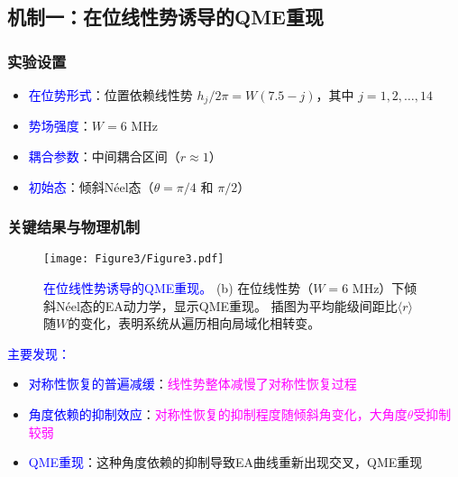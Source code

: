 \documentclass[11pt,a4paper]{article}
\begin{document}
\subsection{机制一：在位线性势诱导的QME重现}

\subsubsection{实验设置}
\begin{itemize}
    \item \textcolor{blue}{在位势形式}：位置依赖线性势 $h_j/2\pi = W(7.5 - j)$，其中 $j=1,2,\ldots,14$
    \item \textcolor{blue}{势场强度}：$W = 6$ MHz
    \item \textcolor{blue}{耦合参数}：中间耦合区间（$r \approx 1$）
    \item \textcolor{blue}{初始态}：倾斜Néel态（$\theta = \pi/4$ 和 $\pi/2$）
\end{itemize}

\subsubsection{关键结果与物理机制}
\begin{figure}[H]
    \centering
    \texttt{[image: Figure3/Figure3.pdf]}
    \caption{
        \textcolor{blue}{在位线性势诱导的QME重现。}
        (b) 在位线性势（$W = 6$ MHz）下倾斜Néel态的EA动力学，显示QME重现。
        插图为平均能级间距比$\langle r \rangle$随$W$的变化，表明系统从遍历相向局域化相转变。
    }
    \label{fig:QME_reemergence_linear}
\end{figure}

\textcolor{blue}{主要发现：}
\begin{itemize}
    \item \textcolor{blue}{对称性恢复的普遍减缓}：\textcolor{magenta}{线性势整体减慢了对称性恢复过程}
    \item \textcolor{blue}{角度依赖的抑制效应}：\textcolor{magenta}{对称性恢复的抑制程度随倾斜角变化，大角度$\theta$受抑制较弱}
    \item \textcolor{blue}{QME重现}：这种角度依赖的抑制导致EA曲线重新出现交叉，QME重现
\end{itemize}
\end{document}

